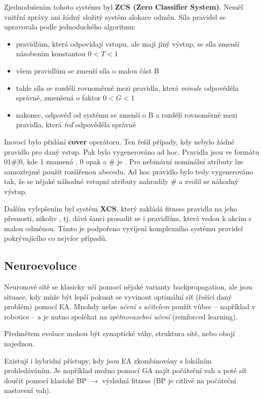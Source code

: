 Zjednodušením tohoto systému byl \textbf{ZCS (Zero Classifier System)}. Neměl vnitřní zprávy ani žádný složitý systém alokace odměn. Síla pravidel se upravovala podle jednoduchého algoritmu:
\begin{itemize}
	
	
	\item pravidlům, která odpovídají vstupu, ale mají jiný výstup, se síla zmenší násobením konstantou $0 < T < 1$
	\item všem pravidlům se zmenší síla o malou část B
	\item tahle síla se rozdělí rovnoměrně mezi pravidla, která \textit{minule} odpověděla správně, zmenšená o faktor $0<G<1$
	\item nakonec, odpověď od systému se zmenší o B a rozdělí rovnoměrně mezi pravidla, která \textit{teď} odpověděla správně
\end{itemize}
Inovací bylo přidání \textbf{cover} operátoru. Ten řešil případy, kdy nebylo žádné pravidlo pro daný vstup. Pak bylo vygenerováno ad hoc. Pravidla jsou ve formátu $01\#|0$, kde 1 znamená , 0 opak a $\#$ je . Pro nebinární nominální atributy lze samozřejmě použít rozšířenou abecedu. Ad hoc pravidlo bylo tedy vygenerováno tak, že se nějaké náhodné vstupní atributy nahradily $\#$ a zvolil se náhodný výstup.

Dalším vylepšením byl systém \textbf{XCS}, který zakládá fitness pravidla na jeho přesnosti, nikoliv , tj. dává šanci prosadit se i pravidlům, která vedou k akcím s malou odměnou. Tímto je podpořeno vyvíjení komplexního systému pravidel pokrývajícího co nejvíce případů.




\subsection{Neuroevoluce}
\label{neuroevolution}
Neuronové sítě se klasicky učí pomocí nějaké varianty backpropagation, ale jsou situace, kdy může být lepší pokusit se vyvinout optimální síť (řešící daný problém) pomocí EA. Mnohdy nelze \textit{učení s učitelem} použít vůbec -- například v robotice -- a je nutno spoléhat na \textit{zpětnovazební učení} (reinforced learning).

Předmětem evoluce mohou být synaptické váhy, struktura sítě, nebo obojí najednou. 

Existují i hybridní přístupy, kdy jsou EA zkombinovány s lokálním prohledáváním. Je například možno pomocí GA najít počáteční vah a poté síť doučit pomocí klasické BP $\rightarrow$ výsledná fitness (BP je citlivé na počáteční nastavení vah).

